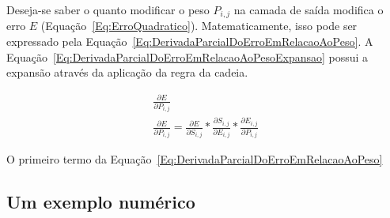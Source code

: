 Deseja-se saber o quanto modificar o peso $P_{i, j}$ na camada de saída modifica o erro $E$ (Equação~\ref{Eq:ErroQuadratico}). Matematicamente, isso pode ser expressado pela Equação~\ref{Eq:DerivadaParcialDoErroEmRelacaoAoPeso}. A Equação~\ref{Eq:DerivadaParcialDoErroEmRelacaoAoPesoExpansao} possui a expansão através da aplicação da regra da cadeia.

\begin{gather}\label{Eq:DerivadaParcialDoErroEmRelacaoAoPeso}
\frac{\partial E}{\partial P_{i,j}} \\ \label{Eq:DerivadaParcialDoErroEmRelacaoAoPesoExpansao}
\frac{\partial E}{\partial P_{i,j}} = \frac{\partial E}{\partial S_{i,j}} * \frac{\partial S_{i, j}}{\partial E_{i,j}} * \frac{\partial E_{i,j}}{\partial P_{i,j}}
\end{gather}

O primeiro termo da Equação~\ref{Eq:DerivadaParcialDoErroEmRelacaoAoPeso}

\subsection{Um exemplo numérico}